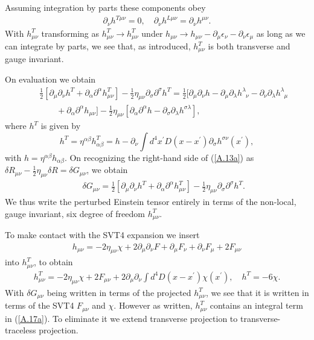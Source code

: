 %
Assuming integration by parts these components obey
%
\begin{eqnarray}
\partial_{\nu}h^{T\mu\nu}
=0,\quad 
\partial_{\nu}h^{L\mu\nu}=\partial_{\nu}h^{\mu\nu}.
\label{A.12a}
\end{eqnarray}
% 
With $h^{T}_{\mu\nu}$ transforming as $h^{T}_{\mu\nu}\rightarrow h^{T}_{\mu\nu}$ under $h_{\mu\nu}\rightarrow h_{\mu\nu}-\partial_{\mu}\epsilon_{\nu}-\partial_{\nu}\epsilon_{\mu}$ as long as we can integrate by parts, we see that, as introduced, $h^{T}_{\mu\nu}$ is both transverse and gauge invariant. 

On evaluation we obtain 
%
\begin{align}
&&\frac{1}{2}[\partial_{\mu}\partial_{\nu}h^{T}
+\partial_{\alpha}\partial^{\alpha}h_{\mu\nu}^{T}]
-\frac{1}{2}\eta_{\mu\nu}\partial_{\sigma}\partial^{\sigma}
h^{T}
=\frac{1}{2}[\partial_{\mu}\partial_{\nu}h
-\partial_{\mu}\partial_{\lambda}h^{\lambda}_{\phantom{\lambda}\nu}
-\partial_{\nu}\partial_{\lambda}h^{\lambda}_{\phantom{\lambda}\mu} 
\nonumber\\
&&\qquad
+\partial_{\alpha}\partial^{\alpha}h_{\mu\nu}]
-\frac{1}{2}\eta_{\mu\nu}[\partial_{\alpha}\partial^{\alpha}h
-\partial_{\sigma}\partial_{\lambda}h^{\sigma\lambda}],
\label{A.13a}
\end{align}
%
where $h^{T}$ is given by
%
\begin{equation}
h^{T}=\eta^{\alpha\beta}h_{\alpha\beta}^{T}
=h -\partial_{\nu}\int
d^4x^{\prime}D(x-x^{\prime})\partial_{\sigma}
h^{\sigma\nu}(x^{\prime}),
\label{A.14a}
\end{equation}
%
with $h=\eta^{\alpha\beta}h_{\alpha\beta}$. On recognizing the right-hand side of  (\ref{A.13a}) as $\delta R_{\mu\nu}-\frac{1}{2}\eta_{\mu\nu}\delta R=\delta G_{\mu\nu}$,
we obtain 
%
\begin{eqnarray}
&&\delta G_{\mu\nu}=\tfrac{1}{2}[\partial_{\mu}\partial_{\nu}h^{T}
+\partial_{\alpha}\partial^{\alpha}h_{\mu\nu}^{T}]
-\frac{1}{2}\eta_{\mu\nu}\partial_{\sigma}\partial^{\sigma}
h^{T}.
\label{A.15a}
\end{eqnarray}
%
We thus write the perturbed Einstein tensor entirely in terms of the non-local, gauge invariant, six degree of freedom $h_{\mu\nu}^T$.

To make contact with the SVT4 expansion we insert
%
\begin{eqnarray}
h_{\mu\nu}=-2\eta_{\mu\nu}\chi+2\partial_{\mu}\partial_{\nu}F
+ \partial_{\mu}F_{\nu}+\partial_{\nu}F_{\mu}+2F_{\mu\nu}
\label{A.16a}
\end{eqnarray}
%
into $h_{\mu\nu}^T$,  to obtain
%
\begin{eqnarray}
h^T_{\mu\nu}=-2\eta_{\mu\nu}\chi+2F_{\mu\nu}+2\partial_{\mu}\partial_{\nu}\int d^4D(x-x^{\prime})\chi(x^{\prime}),\quad h^T=-6\chi.
\label{A.17a}
\end{eqnarray}
%
With $\delta G_{\mu\nu}$ being written in terms of the projected $h^T_{\mu\nu}$, we see that it is written in terms of the SVT4 $F_{\mu\nu}$ and $\chi$. However as written, $h_{\mu\nu}^T$ contains an integral term in (\ref{A.17a}). To eliminate it we extend transverse projection to transverse-traceless projection.

